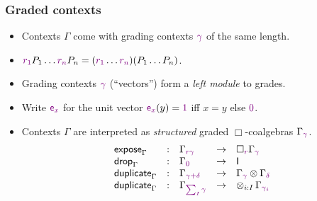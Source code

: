 \documentclass[t,fleqn,usenames,dvipsnames]{beamer}
\newcommand{\cType}{\color{orange!60!black}}
\renewcommand{\emph}[1]{\textit{\cType#1}}
\begin{document}
\renewcommand{\rr}{\rescol{r}}
\renewcommand{\r}[1]{\rescol{r_{#1}}}
\newcommand{\Gg}{\rescol{\gamma}}
\newcommand{\Gd}{\rescol{\delta}}

\newcommand{\sometimes}[1]{\langle \rescol{#1} \rangle}


\begin{frame}[fragile=singleslide]
  \frametitle{Graded contexts}
  \begin{itemize}
  \item Contexts $\Gamma$ come with grading contexts $\Gg$ of the same length.
  \item $\r{1}P_1\dots \r{n}P_n = (\r{1}\dots \r{n})(P_1 \dots P_n)$.
  \item Grading contexts $\Gg$ (``vectors'') form a \emph{left module} to grades.
  \item Write ${\color{violet}\mathsf{e}_x}$ for the unit vector ${\color{violet}\mathsf{e}_x}(y) = {\color{violet}1}$ iff $x=y$ else ${\color{violet}0}$.
  \item Contexts $\Gamma$ are interpreted as \emph{structured} graded $\Box$-coalgebras $\Gamma_{\rescol{\Gg}}$.
\[
  \begin{array}{lclcl}
    \texpose_\Gamma& : & \Gamma_{\rescol{\rr\Gg}} & \to & \forever r \Gamma_{\rescol{\Gg}} \\
    \tdrop_\Gamma & : & \Gamma_{\rescol{0}} & \to & \I \\
    \tduplicate_\Gamma & : & \Gamma_{\rescol{\Gg+\Gd}} & \to & \Gamma_{\rescol{\Gg}} \otimes \Gamma_{\rescol{\Gd}} \\
    \tduplicate_\Gamma & : & \Gamma_{\rescol{\sum_I \Gg}} & \to & \tupt {i:I} \Gamma_{\rescol{\Gg_i}} \\
  \end{array}
\]
  \end{itemize}
\end{frame}


\end{document}
